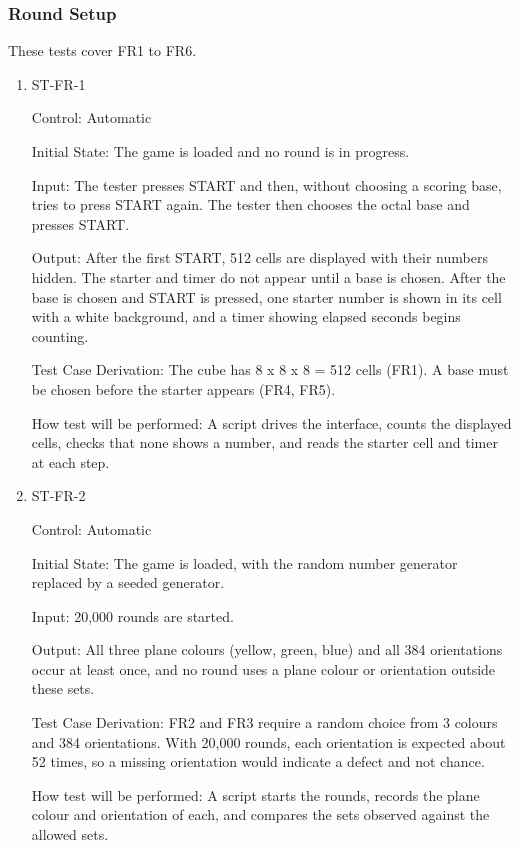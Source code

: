 \documentclass[12pt, titlepage]{article}
\begin{document}
\subsubsection{Round Setup}

These tests cover FR1 to FR6.

\begin{enumerate}

\item{ST-FR-1\\}

Control: Automatic

Initial State: The game is loaded and no round is in progress.

Input: The tester presses START and then, without choosing a scoring base, tries to press START again. The tester then chooses the octal base and presses START.

Output: After the first START, 512 cells are displayed with their numbers hidden. The starter and timer do not appear until a base is chosen. After the base is chosen and START is pressed, one starter number is shown in its cell with a white background, and a timer showing elapsed seconds begins counting.

Test Case Derivation: The cube has 8 x 8 x 8 = 512 cells (FR1). A base must be chosen before the starter appears (FR4, FR5).

How test will be performed: A script drives the interface, counts the displayed cells, checks that none shows a number, and reads the starter cell and timer at each step.

\item{ST-FR-2\\}

Control: Automatic

Initial State: The game is loaded, with the random number generator replaced by a seeded generator.

Input: 20,000 rounds are started.

Output: All three plane colours (yellow, green, blue) and all 384 orientations occur at least once, and no round uses a plane colour or orientation outside these sets.

Test Case Derivation: FR2 and FR3 require a random choice from 3 colours and 384 orientations. With 20,000 rounds, each orientation is expected about 52 times, so a missing orientation would indicate a defect and not chance.

How test will be performed: A script starts the rounds, records the plane colour and orientation of each, and compares the sets observed against the allowed sets.


\end{enumerate}
\end{document}
